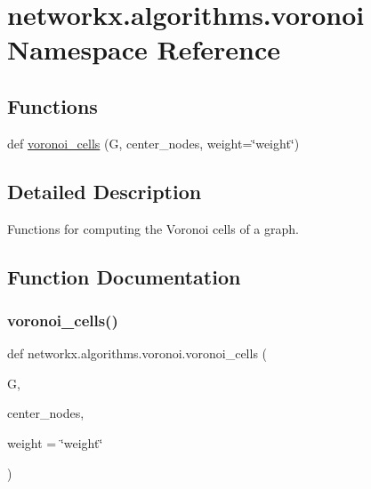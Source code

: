 \hypertarget{namespacenetworkx_1_1algorithms_1_1voronoi}{}\section{networkx.\+algorithms.\+voronoi Namespace Reference}
\label{namespacenetworkx_1_1algorithms_1_1voronoi}
\subsection*{Functions}
\begin{DoxyCompactItemize}
\item 
def \hyperlink{namespacenetworkx_1_1algorithms_1_1voronoi_a225ef095aaec3127b127d6c7e30489e4}{voronoi\+\_\+cells} (G, center\+\_\+nodes, weight=\char`\"{}weight\char`\"{})
\end{DoxyCompactItemize}


\subsection{Detailed Description}
\begin{DoxyVerb}Functions for computing the Voronoi cells of a graph.\end{DoxyVerb}
 

\subsection{Function Documentation}
\mbox{\label{namespacenetworkx_1_1algorithms_1_1voronoi_a225ef095aaec3127b127d6c7e30489e4}} 
\subsubsection{\texorpdfstring{voronoi\+\_\+cells()}{voronoi\_cells()}}
{\footnotesize\ttfamily def networkx.\+algorithms.\+voronoi.\+voronoi\+\_\+cells (\begin{DoxyParamCaption}\item[{}]{G,  }\item[{}]{center\+\_\+nodes,  }\item[{}]{weight = {\ttfamily \char`\"{}weight\char`\"{}} }\end{DoxyParamCaption})}


